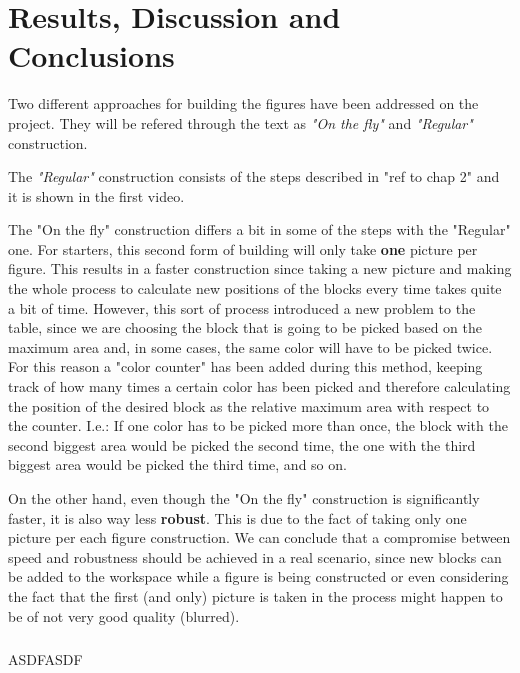 \chapter{Results, Discussion and Conclusions}\label{ch:conclusion}

Two different approaches for building the figures have been addressed on the project. They will be refered through the text as \textit{"On the fly"} and \textit{"Regular"} construction.

The \textit{"Regular"} construction consists of the steps described in "ref to chap 2" and it is shown in the first video. 

The "On the fly" construction differs a bit in some of the steps with the "Regular" one.
For starters, this second form of building will only take \textbf{one} picture per figure. This results in a faster construction since taking a new picture and making the whole process to calculate new positions of the blocks every time takes quite a bit of time.
However, this sort of process introduced a new problem to the table, since we are choosing the block that is going to be picked based on the maximum area and, in some cases, the same color will have to be picked twice.
For this reason a "color counter" has been added during this method, keeping track of how many times a certain color has been picked and therefore calculating the position of the desired block as the relative maximum area with respect to the counter. I.e.: If one color has to be picked more than once, the block with the second biggest area would be picked the second time, the one with the third biggest area would be picked the third time, and so on. 

On the other hand, even though the "On the fly" construction is significantly faster, it is also way less \textbf{robust}. This is due to the fact of taking only one picture per each figure construction. 
We can conclude that a compromise between speed and robustness should be achieved in a real scenario, since new blocks can be added to the workspace while a figure is being constructed or even considering the fact that the first (and only) picture is taken in the process might happen to be of not very good quality (blurred).

\paragraph{} ASDFASDF
